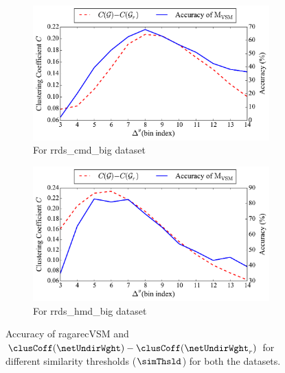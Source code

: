 \begin{figure}

	\begin{subfigure}{\textwidth}
			\centering
	\includegraphics[width=\figSizeEighty]{ch07_ragaRecognition/figures/CarnaticConfig3_Accuracy_vs_CCdiff.pdf}
		\caption{For \acrshort{rrds_cmd_big} dataset}
		\label{fig:performance_across_thresholds_cmd}
	\end{subfigure}
	\begin{subfigure}{\textwidth}
			\centering
		\includegraphics[width=\figSizeEighty]{ch07_ragaRecognition/figures/HindustaniConfig2_Accuracy_vs_CCdiff.pdf}
		\caption{For \acrshort{rrds_hmd_big} dataset}
		\label{fig:performance_across_thresholds_hmd}
	\end{subfigure}
		\caption{Accuracy of \acrshort{ragarecVSM} and $\clusCoff(\netUndirWght)-\clusCoff(\netUndirWght_r)$ for different similarity thresholds ($\simThsld$) for both the datasets.}
		\label{fig:performance_across_thresholds}
\end{figure}


